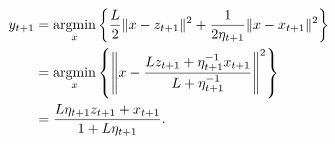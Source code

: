 \begin{remark}
\begin{align*}
                y_{t + 1} &= \mathop{\rm argmin}\limits_{x}\left\lbrace
                    \frac{L}{2}\Vert x - z_{t + 1}\Vert^2 + 
                    \frac{1}{2\eta_{t + 1}}\Vert x - x_{t + 1}\Vert^2
                \right\rbrace
                \\
                &= \mathop{\rm argmin}\limits_{x}\left\lbrace
                    \left\Vert x - 
                        \frac{Lz_{t + 1} + \eta_{t + 1}^{-1}x_{t + 1}}{
                            L + \eta_{t + 1}^{-1}
                        }
                    \right\Vert^2
                \right\rbrace
                \\
                &= 
                \frac{
                    L\eta_{t + 1}z_{t + 1} + 
                    x_{t + 1}
                }{
                    1 + L \eta_{t + 1}
                }. 
            \end{align*}
        \end{remark}


